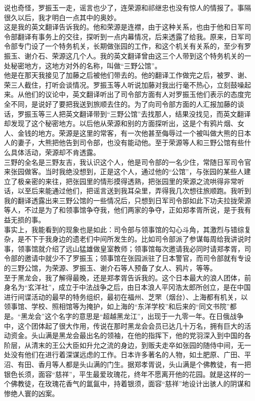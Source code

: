 说也奇怪，罗振玉一走，谣言也少了，连荣源和祁继忠也没有惊人的情报了。事隔很久以后，我才明白一点其中的奥妙。\\

这是我的英文翻译告诉我的。他和荣源是连襟，由于这种关系，也由于他和日军司令部翻译有事务上的交往，探听到一点内幕情况，后来透露了给我。原来，日军司令部专门设了一个特务机关，长期做张园的工作，和这个机关有关系的，至少有罗振玉、谢介石、荣源这几个人。我的英文翻译曾由这三个人带到这个特务机关的一处秘密地方，这地方对外的名称，叫做“三野公馆”。\\

他是在那天我接见了加藤之后被他们带去的。他的翻译工作做完之后，被罗、谢、荣三人截住，打听会谈情况。罗振玉等人听说加藤对我出行毫不热心，立刻鼓噪起来。从他们的议论中，英文翻译听出了司令部方面有人对罗振玉他们表示的态度完全不同，是说好了要把我送到旅顺去住的。为了向司令部方面的人汇报加藤的谈话，罗振玉等三人把英文翻译带到“三野公馆”去找那人，结果没找见，而英文翻译却发现了这个秘密地方。以后他从荣源和别的方面探听出，这是个有鸦片烟、女人、金钱的地方。荣源是这里的常客，有一次他甚至侮辱过一个被叫做大熊的日本人的妻子，大熊把他告到司令部，也没有能动他。至于荣源等人和三野公馆有些什么具体活动，荣源却不肯透露。\\

三野的全名是三野友吉，我认识这个人，他是司令部的一名少住，常随日军司令官来张园做客。当时我绝没想到，正是这个人，通过他的“公馆”，与张园的某些人建立了极亲密的来往，把张园里的情形摸得透熟，把张园里的荣源之流哄得非常听话，以至后来能通过他们，把谣言送到我耳朵里，弄得我几次想往旅顺跑。我听到我的翻译透露出来三野公馆的一些情况后，只想到日军司令部如此下功夫拉拢荣源等人，不过是为了和领事馆争夺我，他们两家的争夺，正如郑孝胥所说，是于我有益无损的事。\\

事实上，我能看到的现象也是如此：司令部与领事馆的勾心斗角，其激烈与错综复杂，是不下于我身边的遗老们中间所发生的。比如司令部派了参谋每周给我讲说时事，领事馆就介绍了远山猛雄做皇室教师；领事馆每次邀请我必同时请郑孝胥，司令部的邀请中就少不了罗振玉；领事馆在张园派驻了日本警官，而司令部就有专设的三野公馆，为荣源、罗振玉、谢介石等人预备了女人、鸦片，等等。\\

至于黑龙会，我了解得最晚，还是郑孝胥告诉我的。这个日本最大的浪人团体，前身名为“玄洋社”，成立于中法战争之后，由日本浪人平冈浩太郎所创立，是在中国进行间谍活动的最早的特务组织，最初在福州、芝罘（烟台）、上海都有机关，以领事馆、学校、照相馆等为掩护，如上海的“东洋学校”和后来的“同文书院”都是。“黑龙会”这个名字的意思是“超越黑龙江”，出现于一九零一年。在日俄战争中，这个团体起了很大作用，传说在那时黑龙会会员已达几十万名，拥有巨大的活动资金。头山满是黑龙会最出名的领袖，在他的指挥下，他的党羽深入到中国的各阶层，从清末的王公大臣如升允之流的身边，到贩夫走卒如张园的随侍中间，无一处没有他们在进行着深谋远虑的工作。日本许多著名的人物，如土肥原、广田、平沼、有田、香月等人都是头山满的门生。据郑孝胥说，头山满是个佛教徒，有一把银色长须，面容“慈祥”，平生最爱玫瑰花，终年不愿离开他的花园。就是这样的一个佛教徒，在玫瑰花香气的氲氤中，持着银须，面容“慈祥”地设计出骇人的阴谋和惨绝人寰的凶案。\\

